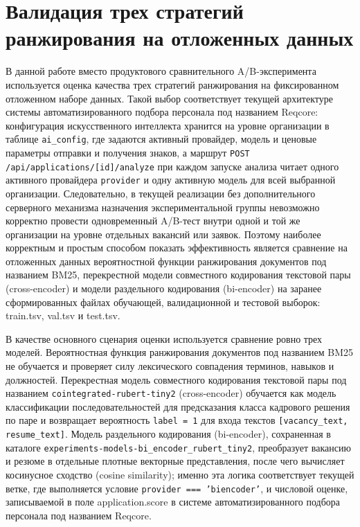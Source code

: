 \section{Валидация трех стратегий ранжирования на отложенных данных}

В данной работе вместо продуктового сравнительного A/B-эксперимента используется оценка качества трех стратегий ранжирования на фиксированном отложенном наборе данных. Такой выбор соответствует текущей архитектуре системы автоматизированного подбора персонала под названием Reqcore: конфигурация искусственного интеллекта хранится на уровне организации в таблице \texttt{ai\_config}, где задаются активный провайдер, модель и ценовые параметры отправки и получения знаков, а маршрут \texttt{POST {\slash}api{\slash}applications{\slash}{[}id{]}{\slash}analyze} при каждом запуске анализа читает одного активного провайдера \texttt{provider} и одну активную модель для всей выбранной организации. Следовательно, в текущей реализации без дополнительного серверного механизма назначения экспериментальной группы невозможно корректно провести одновременный A/B-тест внутри одной и той же организации на уровне отдельных вакансий или заявок. Поэтому наиболее корректным и простым способом показать эффективность является сравнение на отложенных данных вероятностной функции ранжирования документов под названием BM25, перекрестной модели совместного кодирования текстовой пары (cross-encoder) и модели раздельного кодирования (bi-encoder) на заранее сформированных файлах обучающей, валидационной и тестовой выборок: train.tsv, val.tsv и test.tsv.

В качестве основного сценария оценки используется сравнение ровно трех моделей. Вероятностная функция ранжирования документов под названием BM25 не обучается и проверяет силу лексического совпадения терминов, навыков и должностей. Перекрестная модель совместного кодирования текстовой пары под названием \texttt{cointegrated-rubert-tiny2} (cross-encoder) обучается как модель классификации последовательностей для предсказания класса кадрового решения по паре и возвращает вероятность \texttt{label = 1} для входа текстов \texttt{{[}vacancy\_text, resume\_text{]}}. Модель раздельного кодирования (bi-encoder), сохраненная в каталоге \texttt{experiments-models-bi\_encoder\_rubert\_tiny2}, преобразует вакансию и резюме в отдельные плотные векторные представления, после чего вычисляет косинусное сходство (cosine similarity); именно эта логика соответствует текущей ветке, где выполняется условие \texttt{provider === 'biencoder'}, и числовой оценке, записываемой в поле application.score в системе автоматизированного подбора персонала под названием Reqcore.

